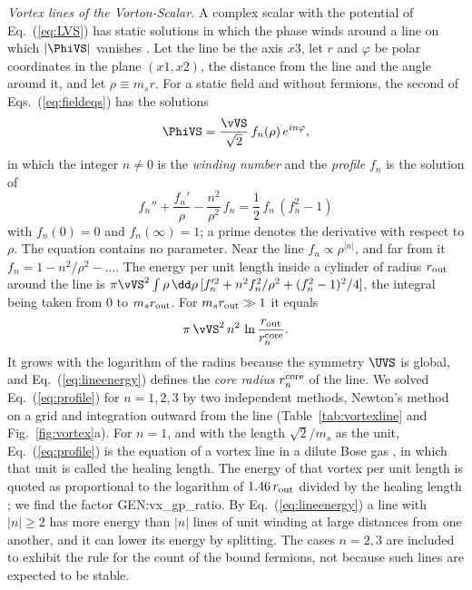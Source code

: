 \emph{Vortex lines of the Vorton-Scalar.} A complex scalar with the potential of
Eq.~(\ref{eq:LVS}) has static solutions in which the phase winds around a line on which $|\PhiVS|$
vanishes \cite{NielsenOlesen1973}. Let the line be the axis $x3$, let $r$ and $\varphi$ be polar
coordinates in the plane $(x1,x2)$, the distance from the line and the angle around it, and let
$\rho\equiv m_sr$. For a static field and without fermions, the second of
Eqs.~(\ref{eq:fieldeqs}) has the solutions
\begin{equation}
\PhiVS=\frac{\vVS}{\sqrt2}\,f_n(\rho)\,e^{in\varphi},
\label{eq:vortexline}
\end{equation}
in which the integer $n\neq0$ is the \emph{winding number} and the \emph{profile} $f_n$ is the
solution of
\begin{equation}
f_n''+\frac{f_n'}{\rho}-\frac{n^2}{\rho^2}\,f_n=\frac12\,f_n\,(f_n^2-1)
\label{eq:profile}
\end{equation}
with $f_n(0)=0$ and $f_n(\infty)=1$; a prime denotes the derivative with respect to $\rho$. The
equation contains no parameter. Near the line $f_n\propto\rho^{|n|}$, and far from it
$f_n=1-n^2/\rho^2-\dots$. The energy per unit length inside a cylinder of radius $r_{\rm out}$
around the line is
$\pi\vVS^2\int\rho\,\dd\rho\,[f_n'^2+n^2f_n^2/\rho^2+(f_n^2-1)^2/4]$, the integral being taken
from 0 to $m_sr_{\rm out}$. For $m_sr_{\rm out}\gg1$ it equals
\begin{equation}
\pi\,\vVS^2\,n^2\,\ln\frac{r_{\rm out}}{r^{\rm core}_n}.
\label{eq:lineenergy}
\end{equation}
It grows with the logarithm of the radius because the symmetry $\UVS$ is global, and
Eq.~(\ref{eq:lineenergy}) defines the \emph{core radius} $r^{\rm core}_n$ of the line. We solved
Eq.~(\ref{eq:profile}) for $n=1,2,3$ by two independent methods, Newton's method on a grid and
integration outward from the line (Table~\ref{tab:vortexline} and Fig.~\ref{fig:vortex}a). For
$n=1$, and with the length $\sqrt2/m_s$ as the unit, Eq.~(\ref{eq:profile}) is the equation of a
vortex line in a dilute Bose gas \cite{GinzburgPitaevskii1958,Gross1961,Pitaevskii1961}, in which
that unit is called the healing length. The energy of that vortex per unit length is quoted as
proportional to the logarithm of $1.46\,r_{\rm out}$ divided by the healing length
\cite{Fetter2009}; we find the factor {{GEN:vx_gp_ratio}}. By Eq.~(\ref{eq:lineenergy}) a line
with $|n|\ge2$ has more energy than $|n|$ lines of unit winding at large distances from one another,
and it can lower its energy by splitting. The cases $n=2,3$ are included to exhibit the rule for
the count of the bound fermions, not because such lines are expected to be stable.

